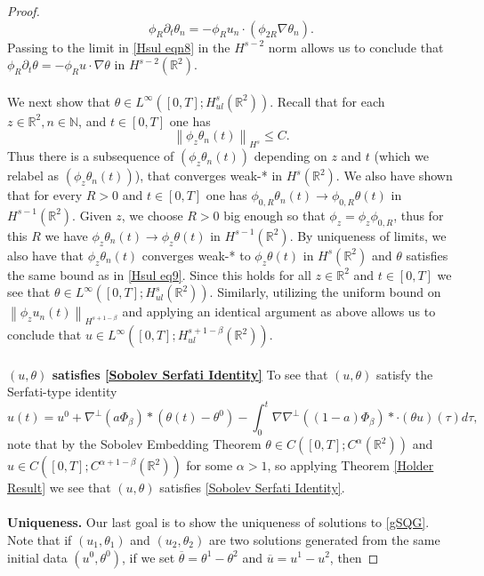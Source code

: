 \documentclass[12pt,xcolor=svgnames]{amsart}
\newcommand{\R}{\mathbb{R}}
\newcommand{\norm}[2]{\left\lVert#1\right\rVert_{#2}}
\begin{document}
\begin{proof}
\begin{equation}
\label{Hsul eqn8}
\phi_{R}\partial_t\theta_n = -\phi_R u_n \cdot (\phi_{2R}\nabla \theta_n).
\end{equation}
Passing to the limit in \eqref{Hsul eqn8} in the $H^{s-2}$ norm allows us to conclude that $\phi_{R}\partial_t\theta=-\phi_{R} u \cdot \nabla \theta$ in $H^{s-2}(\R^2)$.
\\
\\
We next show that $\theta \in L^{\infty}([0,T];H_{ul}^s(\R^2))$. Recall that for each $z \in \R^2, n \in \mathbb{N}$, and $ t \in [0,T]$ one has 
\begin{equation}
\label{Hsul eq9}
\norm{\phi_z\theta_n(t)}{H^s} \leq C.
\end{equation}
Thus there is a subsequence of $(\phi_z\theta_n(t))$ depending on $z$ and $t$ (which we relabel as $(\phi_z\theta_n(t))$), that converges weak-* in $H^s(\R^2)$. We also have shown that for every $R>0$ and $t\in [0,T]$ one has $\phi_{0,R}\theta_n(t) \to \phi_{0,R}\theta(t)$ in $H^{s-1}(\R^2)$. Given $z$, we choose $R>0$ big enough so that $\phi_z=\phi_z\phi_{0,R}$, thus for this $R$ we have $\phi_z\theta_n(t) \to \phi_z\theta(t)$ in $H^{s-1}(\R^2)$. By uniqueness of limits, we also have that $\phi_z\theta_n(t)$ converges weak-* to $\phi_z\theta(t)$ in $H^s(\R^2)$ and $\theta$ satisfies the same bound as in \eqref{Hsul eq9}. Since this holds for all $z \in \R^2$ and $t\in [0,T]$ we see that $\theta \in L^{\infty}([0,T];H_{ul}^s(\R^2))$. Similarly, utilizing the uniform bound on $\norm{\phi_zu_n(t)}{H^{s+1-\beta}}$ and applying an identical argument as above allows us to conclude that $u \in L^{\infty}([0,T];H^{s+1-\beta}_{ul}(\R^2))$.
\\
\\
\textbf{$(u,\theta)$ satisfies \eqref{Sobolev Serfati Identity}}
To see that $(u,\theta)$ satisfy the Serfati-type identity 
$$
u(t)=u^0 + \nabla^{\perp}(a\Phi_{\beta})\ast (\theta(t)-\theta^0) - \int_0^t \nabla\nabla^{\perp}((1-a)\Phi_{\beta})\ast\cdot(\theta u)(\tau)d\tau,
$$
note that by the Sobolev Embedding Theorem $\theta \in C([0,T];C^{\alpha}(\R^2))$ and\\ $u \in C([0,T];C^{\alpha+1-\beta}(\R^2))$ for some $\alpha >1$, so applying Theorem \ref{Holder Result} we see that $(u,\theta)$ satisfies \eqref{Sobolev Serfati Identity}.
\\
\\
\textbf{Uniqueness.} Our last goal is to show the uniqueness of solutions to \eqref{gSQG}. Note that if $(u_1,\theta_1)$ and $(u_2,\theta_2)$ are two solutions generated from the same initial data $(u^0,\theta^0)$, if we set $\overline{\theta}=\theta^1-\theta^2$ and $\overline{u}=u^1-u^2$, then 


\end{proof}
\end{document}
